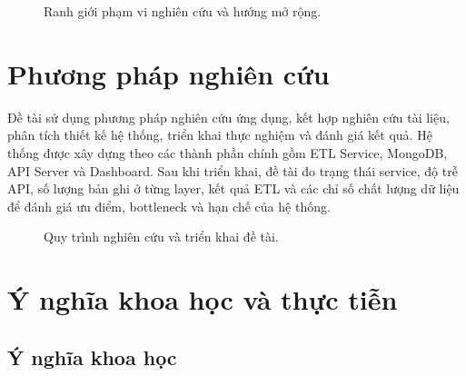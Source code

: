 \documentclass[12pt,a4paper]{article}
\begin{document}
\begin{figure}[htbp]
\centering
{}
\caption{Ranh giới phạm vi nghiên cứu và hướng mở rộng.}
\end{figure}

\section{Phương pháp nghiên cứu}

Đề tài sử dụng phương pháp nghiên cứu ứng dụng, kết hợp nghiên cứu tài liệu, phân tích thiết kế hệ thống, triển khai thực nghiệm và đánh giá kết quả. Hệ thống được xây dựng theo các thành phần chính gồm ETL Service, MongoDB, API Server và Dashboard. Sau khi triển khai, đề tài đo trạng thái service, độ trễ API, số lượng bản ghi ở từng layer, kết quả ETL và các chỉ số chất lượng dữ liệu để đánh giá ưu điểm, bottleneck và hạn chế của hệ thống.

\begin{figure}[htbp]
\centering
{}
\caption{Quy trình nghiên cứu và triển khai đề tài.}
\end{figure}

\section{Ý nghĩa khoa học và thực tiễn}

\subsection{Ý nghĩa khoa học}
\end{document}
